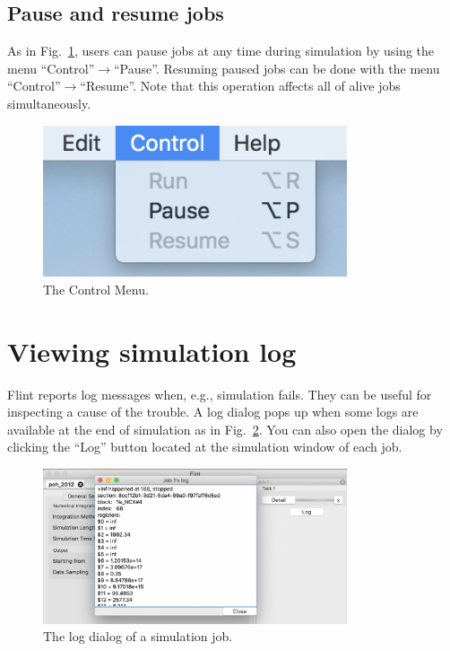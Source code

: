 \documentclass[a4paper,10pt]{report}
\begin{document}
\subsection{Pause and resume jobs}
\label{sec:org32bdf1b}
As in Fig.~\ref{fig:orgd1c151f}, users can pause jobs at any time during simulation
by using the menu ``Control''\(\to\)``Pause''. Resuming paused jobs can
be done with the menu ``Control''\(\to\)``Resume''.
Note that this operation affects all of alive jobs simultaneously.

\begin{figure}[htbp]
\centering
\includegraphics[width=0.8\textwidth]{image/control.png}
\caption{\label{fig:orgd1c151f}The Control Menu.}
\end{figure}

\section{Viewing simulation log}
\label{sec:orge5ef6de}
Flint reports log messages when, e.g., simulation fails.
They can be useful for inspecting a cause of the trouble.
A log dialog pops up when some logs are available at the end of simulation as in Fig.~\ref{fig:org9e71a8c}.
You can also open the dialog by clicking the ``Log'' button located at the simulation window of each job.

\begin{figure}[htbp]
\centering
\includegraphics[width=0.8\textwidth]{image/log.png}
\caption{\label{fig:org9e71a8c}The log dialog of a simulation job.}
\end{figure}
\end{document}

